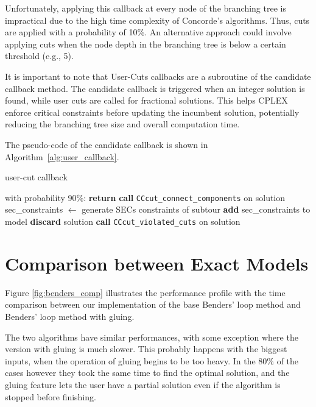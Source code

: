 Unfortunately, applying this callback at every node of the branching tree is impractical due to the high time complexity of Concorde’s algorithms. Thus, cuts are applied with a probability of 10\%. An alternative approach could involve applying cuts when the node depth in the branching tree is below a certain threshold (e.g., 5).

It is important to note that User-Cuts callbacks are a subroutine of the candidate callback method. The candidate callback is triggered when an integer solution is found, while user cuts are called for fractional solutions. This helps CPLEX enforce critical constraints before updating the incumbent solution, potentially reducing the branching tree size and overall computation time.

The pseudo-code of the candidate callback is shown in Algorithm~\ref{alg:user_callback}.

\begin{algorithm}[H]
    \caption{user-cut callback}
    \label{alg:user_callback}
    \begin{spacing}{1.2} %
        \BlankLine
        with probability 90\%: \textbf{return}\;
        \textbf{call} \texttt{CCcut\_connect\_components} on solution\;
        {
            {
                sec\_constraints $\leftarrow$ generate SECs constraints of subtour\;
                \textbf{add} sec\_constraints to model\;
                \textbf{discard} solution\;
            }
        }
        \Else
        {
            \textbf{call} \texttt{CCcut\_violated\_cuts} on solution\;
        }
        \BlankLine
    \end{spacing}
\end{algorithm}

\section{Comparison between Exact Models}
Figure \ref{fig:benders_comp} illustrates the performance profile with the time comparison between our implementation of the base Benders' loop method and Benders' loop method with gluing.

The two algorithms have similar performances, with some exception where the version with gluing is much slower. This probably happens with the biggest inputs, when the operation of gluing begins to be too heavy. 
In the 80\% of the cases however they took the same time to find the optimal solution, and the gluing feature lets the user have a partial solution even if the algorithm is stopped before finishing.

